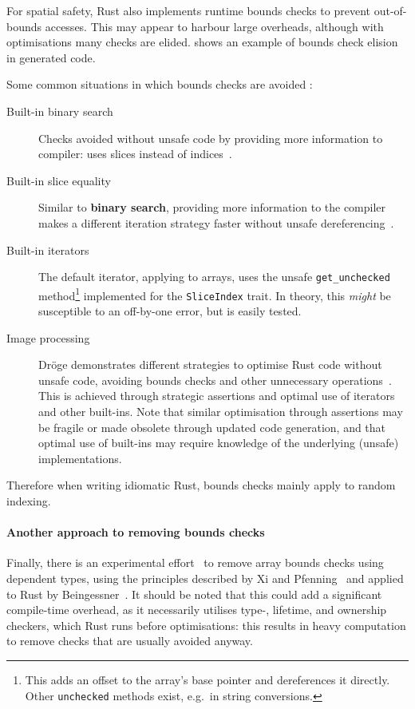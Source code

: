 \documentclass[dissertation.tex]{subfiles}
\begin{document}
For spatial safety, Rust also implements runtime bounds checks to
prevent out-of-bounds accesses.
This may appear to harbour large overheads, although with optimisations
many checks are elided.
 shows  an example of bounds
check elision in generated code.

Some common situations in which bounds checks are avoided :

\begin{description}
    \item[Built-in binary search] Checks avoided without unsafe code by
    providing more information to compiler: uses slices instead of
    indices~\cite{rust-pr-binarysearch}.
    \item[Built-in slice equality] Similar to \textbf{binary search},
    providing more information to the compiler makes a different
    iteration strategy faster without unsafe dereferencing~\cite{rust-pr-slice-partialeq}.
    \item[Built-in iterators] The default iterator, applying to arrays,
    uses the unsafe \texttt{get\_unchecked} method\footnote{This adds an
    offset to the array's base pointer and dereferences it directly.
    Other \texttt{unchecked} methods exist, e.g.\ in string
    conversions.} implemented for the \texttt{SliceIndex} trait.
    In theory, this \emph{might} be susceptible to an off-by-one error,
    but is easily tested.
    \item[Image processing] Dr\"oge demonstrates different strategies to
    optimise Rust code without unsafe code, avoiding bounds checks and
    other unnecessary operations~\cite{droge-opt}.
    This is achieved through strategic assertions and optimal use of
    iterators and other built-ins.
    Note that similar optimisation through assertions may be fragile or
    made obsolete through updated code generation, and that optimal use
    of built-ins may require knowledge of the underlying (unsafe)
    implementations.
\end{description}

Therefore when writing idiomatic Rust, bounds checks mainly apply to
random indexing.

\paragraph{Another approach to removing bounds checks}
Finally, there is an experimental effort~\cite{rust-crate-indexing} to
remove array bounds checks using dependent types, using the principles
described by Xi and Pfenning~\cite{xi-pfenning-dependent} and applied to
Rust by Beingessner~\cite{beingessner}.
It should be noted that this could add a significant compile-time
overhead, as it necessarily utilises type-, lifetime, and ownership
checkers, which Rust runs before optimisations: this results in
heavy computation to remove checks that are usually avoided anyway.
\end{document}
